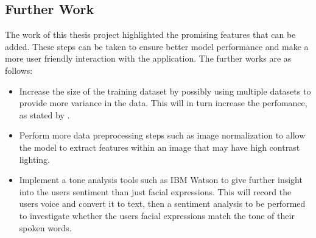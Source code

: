 \subsection{Further Work}
The work of this thesis project highlighted the promising features that can be added. These steps can be taken to ensure better model performance and make a more user friendly interaction with the application. The further works are as follows:
\begin{itemize}
	\item Increase the size of the training dataset by possibly using multiple datasets to provide more variance in the data. This will in turn increase the perfomance, as stated by \citeauthor{LOPES}.
	\item Perform more data preprocessing steps such as image normalization to allow the model to extract features within an image that may have high contrast lighting.
	\item Implement a tone analysis tools such as IBM Watson to give further insight into the users sentiment than just facial expressions. This will record the users voice and convert it to text, then a sentiment analysis to be performed to investigate whether the users facial expressions match the tone of their spoken words.

\end{itemize}
